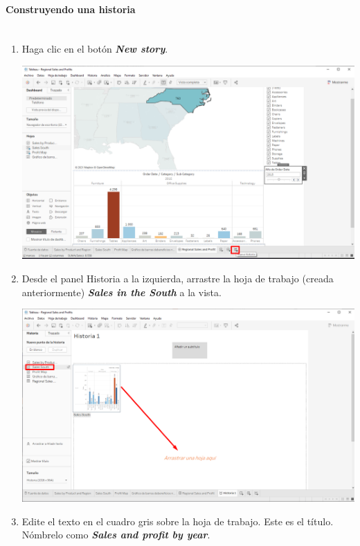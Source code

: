 \documentclass[12pt,letterpaper]{article}
\begin{document}
    \paragraph{\Large Construyendo una historia\\ \\}
    \begin{enumerate}
        \item Haga clic en el botón \textit{\textbf{New story}}.
        \begin{center}
            \includegraphics[width=15cm]{./img/img87.png}
        \end{center}
        \item Desde el panel Historia a la izquierda, arrastre la hoja de trabajo (creada anteriormente) \textit{\textbf{Sales in the South}} a la vista.
        \begin{center}
            \includegraphics[width=15cm]{./img/img88.png}
        \end{center}
        \item Edite el texto en el cuadro gris sobre la hoja de trabajo. Este es el título. Nómbrelo como \textit{\textbf{Sales and profit by year}}.

\end{enumerate}
\end{document}
